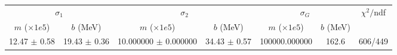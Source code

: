 \begin{tabular}{cc|cc|cc||c}
\multicolumn{2}{c|}{$\sigma_1$} & \multicolumn{2}{|c}{$\sigma_2$} & \multicolumn{2}{|c}{$\sigma_G$}  & \multirow{2}{*}{$\chi^2/$ndf}\\
$m$ ($\times1e5$) & $b$ (MeV) & $m$ ($\times1e5$) & $b$ (MeV) & $m$ ($\times1e5$) & $b$ (MeV) & \\
\hline
12.47 $\pm$ 0.58 & 19.43 $\pm$ 0.36 & 10.000000 $\pm$ 0.000000 & 34.43 $\pm$ 0.57 & 100000.000000 & 162.6 & 606/449\\
\end{tabular}
